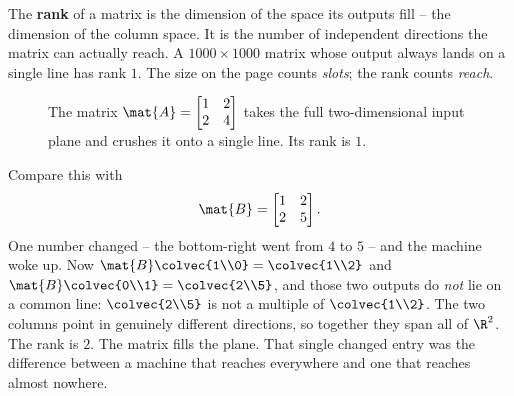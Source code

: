 \begin{intuitionbox}
The \textbf{rank} of a matrix is the dimension of the space its outputs fill --
the dimension of the column space. It is the number of independent directions
the matrix can actually reach. A $1000 \times 1000$ matrix whose output always
lands on a single line has rank $1$. The size on the page counts \emph{slots};
the rank counts \emph{reach}.
\end{intuitionbox}

\begin{figure}[H]
\centering
{}
\caption{The matrix $\protect\mat{A}=\protect\begin{bmatrix}1&2\\2&4\protect\end{bmatrix}$ takes the full
two-dimensional input plane and crushes it onto a single line. Its rank is $1$.}
\label{ch16:collapse}
\end{figure}

Compare this with
\[
  \mat{B} = \begin{bmatrix} 1 & 2 \\ 2 & 5 \end{bmatrix}.
\]
One number changed -- the bottom-right went from $4$ to $5$ -- and the machine
woke up. Now $\mat{B}\colvec{1\\0} = \colvec{1\\2}$ and $\mat{B}\colvec{0\\1} =
\colvec{2\\5}$, and those two outputs do \emph{not} lie on a common line:
$\colvec{2\\5}$ is not a multiple of $\colvec{1\\2}$. The two columns point in
genuinely different directions, so together they span all of $\R^2$. The rank is
$2$. The matrix fills the plane. That single changed entry was the difference
between a machine that reaches everywhere and one that reaches almost nowhere.

